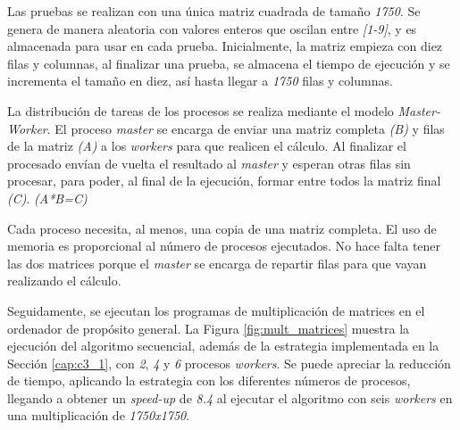 Las pruebas se realizan con una única matriz cuadrada de tamaño \textit{1750}. Se genera de manera aleatoria con valores enteros que oscilan entre \textit{[1-9]}, y es almacenada para usar en cada prueba. Inicialmente, la matriz empieza con diez filas y columnas, al finalizar una prueba, se almacena el tiempo de ejecución y se incrementa el tamaño en diez, así hasta llegar a \textit{1750} filas y columnas. 

La distribución de tareas de los procesos se realiza mediante el modelo \textit{Master-Worker}. El proceso \textit{master} se encarga de enviar una matriz completa \textit{(B)} y filas de la matriz \textit{(A)} a los \textit{workers} para que realicen el cálculo. Al finalizar el procesado envían de vuelta el resultado al \textit{master} y esperan otras filas sin procesar, para poder, al final de la ejecución, formar entre todos la matriz final \textit{(C)}. \textit{(A*B=C)}

Cada proceso necesita, al menos, una copia de una matriz completa. El uso de memoria es proporcional al número de procesos ejecutados. No hace falta tener las dos matrices porque el \textit{master} se encarga de repartir filas para que vayan realizando el cálculo.

\vspace*{0.2cm}

Seguidamente, se ejecutan los programas de multiplicación de matrices en el ordenador de propósito general. La Figura \ref{fig:mult_matrices} muestra la ejecución del algoritmo secuencial, además de la estrategia implementada en la Sección \ref{cap:c3_1}, con \textit{2}, \textit{4} y \textit{6} procesos \textit{workers}. Se puede apreciar la reducción de tiempo, aplicando la estrategia con los diferentes números de procesos, llegando a obtener un \textit{speed-up} de \textit{8.4} al ejecutar el algoritmo con seis \textit{workers} en una multiplicación de \textit{1750x1750}.

